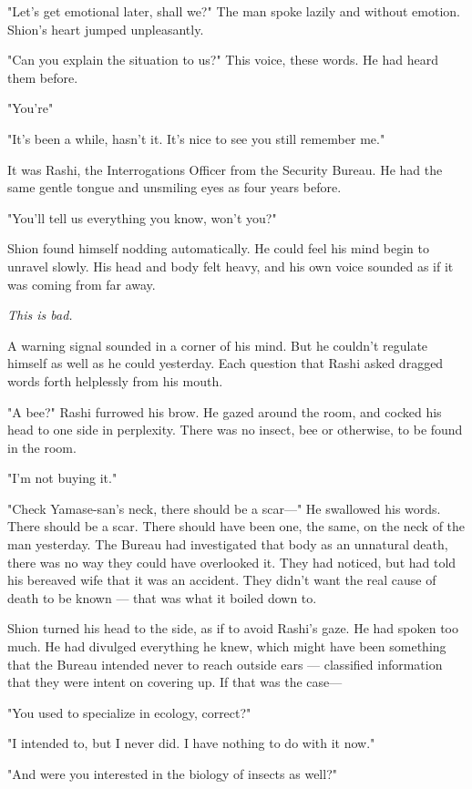 "Let's get emotional later, shall we?" The man spoke lazily and without
emotion. Shion's heart jumped unpleasantly.

"Can you explain the situation to us?" This voice, these words. He had
heard them before.

"You're\el "

"It's been a while, hasn't it. It's nice to see you still remember me."

It was Rashi, the Interrogations Officer from the Security Bureau. He
had the same gentle tongue and unsmiling eyes as four years before.

"You'll tell us everything you know, won't you?"

Shion found himself nodding automatically. He could feel his mind begin
to unravel slowly. His head and body felt heavy, and his own voice
sounded as if it was coming from far away.

\emph{This is bad.}

A warning signal sounded in a corner of his mind. But he couldn't
regulate himself as well as he could yesterday. Each question that Rashi
asked dragged words forth helplessly from his mouth.

"A bee?" Rashi furrowed his brow. He gazed around the room, and cocked
his head to one side in perplexity. There was no insect, bee or
otherwise, to be found in the room.

"I'm not buying it."

"Check Yamase-san's neck, there should be a scar---" He swallowed his
words. There should be a scar. There should have been one, the same, on
the neck of the man yesterday. The Bureau had investigated that body as
an unnatural death, there was no way they could have overlooked it. They
had noticed, but had told his bereaved wife that it was an accident.
They didn't want the real cause of death to be known --- that was what it
boiled down to.

Shion turned his head to the side, as if to avoid Rashi's gaze. He had
spoken too much. He had divulged everything he knew, which might have
been something that the Bureau intended never to reach outside ears ---
classified information that they were intent on covering up. If that was
the case---

"You used to specialize in ecology, correct?"

"I intended to, but I never did. I have nothing to do with it now."

"And were you interested in the biology of insects as well?"

